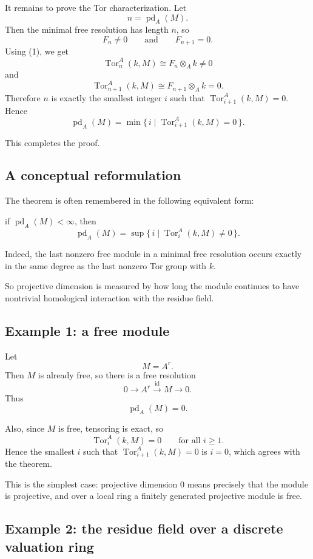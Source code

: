 \documentclass[12pt,a4paper]{article}
\theoremstyle{notespace}
\DeclareMathOperator{\Tor}{Tor}
\begin{document}
It remains to prove the Tor characterization. Let
\[
n=\operatorname{pd}_A(M).
\]
Then the minimal free resolution has length \(n\), so
\[
F_n\neq 0
\qquad \text{and} \qquad
F_{n+1}=0.
\]
Using (1), we get
\[
\Tor_n^A(k,M)\cong F_n\otimes_A k\neq 0
\]
and
\[
\Tor_{n+1}^A(k,M)\cong F_{n+1}\otimes_A k=0.
\]
Therefore \(n\) is exactly the smallest integer \(i\) such that \(\Tor_{i+1}^A(k,M)=0\). Hence
\[
\operatorname{pd}_A(M)
=
\min \bigl\{\, i \;\big|\; \Tor^A_{i+1}(k,M)=0 \,\bigr\}.
\]

This completes the proof.

\subsection{A conceptual reformulation}

The theorem is often remembered in the following equivalent form:

if \(\operatorname{pd}_A(M)<\infty\), then
\[
\operatorname{pd}_A(M)
=
\sup \bigl\{\, i \;\big|\; \Tor_i^A(k,M)\neq 0 \,\bigr\}.
\]

Indeed, the last nonzero free module in a minimal free resolution occurs exactly in the same degree as the last nonzero Tor group with \(k\).

So projective dimension is measured by how long the module continues to have nontrivial homological interaction with the residue field.

\subsection{Example 1: a free module}

Let
\[
M=A^r.
\]
Then \(M\) is already free, so there is a free resolution
\[
0 \longrightarrow A^r \xrightarrow{\operatorname{id}} M \longrightarrow 0.
\]
Thus
\[
\operatorname{pd}_A(M)=0.
\]

Also, since \(M\) is free, tensoring is exact, so
\[
\Tor_i^A(k,M)=0
\qquad \text{for all } i\ge 1.
\]
Hence the smallest \(i\) such that \(\Tor_{i+1}^A(k,M)=0\) is \(i=0\), which agrees with the theorem.

This is the simplest case: projective dimension \(0\) means precisely that the module is projective, and over a local ring a finitely generated projective module is free.

\subsection{Example 2: the residue field over a discrete valuation ring}
\end{document}
